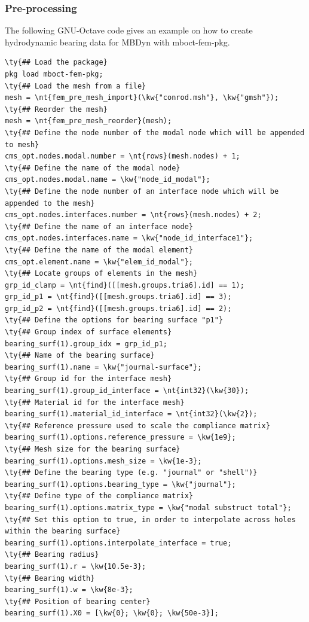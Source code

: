 \subsubsection{Pre-processing}
The following GNU-Octave code gives an example on how to create hydrodynamic bearing data for MBDyn with mboct-fem-pkg.
\begin{Verbatim}[commandchars=\\\{\}]
\ty{## Load the package}
pkg load mboct-fem-pkg;
\ty{## Load the mesh from a file}
mesh = \nt{fem_pre_mesh_import}(\kw{"conrod.msh"}, \kw{"gmsh"});
\ty{## Reorder the mesh}
mesh = \nt{fem_pre_mesh_reorder}(mesh);
\ty{## Define the node number of the modal node which will be appended to mesh}
cms_opt.nodes.modal.number = \nt{rows}(mesh.nodes) + 1;
\ty{## Define the name of the modal node}
cms_opt.nodes.modal.name = \kw{"node_id_modal"};
\ty{## Define the node number of an interface node which will be appended to the mesh}
cms_opt.nodes.interfaces.number = \nt{rows}(mesh.nodes) + 2;
\ty{## Define the name of an interface node}
cms_opt.nodes.interfaces.name = \kw{"node_id_interface1"};
\ty{## Define the name of the modal element}
cms_opt.element.name = \kw{"elem_id_modal"};
\ty{## Locate groups of elements in the mesh}
grp_id_clamp = \nt{find}([[mesh.groups.tria6].id] == 1);
grp_id_p1 = \nt{find}([[mesh.groups.tria6].id] == 3);
grp_id_p2 = \nt{find}([[mesh.groups.tria6].id] == 2);
\ty{## Define the options for bearing surface "p1"}
\ty{## Group index of surface elements}
bearing_surf(1).group_idx = grp_id_p1;
\ty{## Name of the bearing surface}
bearing_surf(1).name = \kw{"journal-surface"};
\ty{## Group id for the interface mesh}
bearing_surf(1).group_id_interface = \nt{int32}(\kw{30});
\ty{## Material id for the interface mesh}
bearing_surf(1).material_id_interface = \nt{int32}(\kw{2});
\ty{## Reference pressure used to scale the compliance matrix}
bearing_surf(1).options.reference_pressure = \kw{1e9};
\ty{## Mesh size for the bearing surface}
bearing_surf(1).options.mesh_size = \kw{1e-3};
\ty{## Define the bearing type (e.g. "journal" or "shell")}
bearing_surf(1).options.bearing_type = \kw{"journal"};
\ty{## Define type of the compliance matrix}
bearing_surf(1).options.matrix_type = \kw{"modal substruct total"};
\ty{## Set this option to true, in order to interpolate across holes within the bearing surface}
bearing_surf(1).options.interpolate_interface = true;
\ty{## Bearing radius}
bearing_surf(1).r = \kw{10.5e-3};
\ty{## Bearing width}
bearing_surf(1).w = \kw{8e-3};
\ty{## Position of bearing center}
bearing_surf(1).X0 = [\kw{0}; \kw{0}; \kw{50e-3}];

\end{Verbatim}
